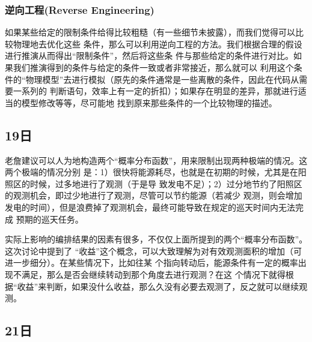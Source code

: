 \begin{itemize}
\subsubsection{\textbf{逆向工程(Reverse Engineering)}}
如果某些给定的限制条件给得比较粗糙（有一些细节未披露），而我们觉得可以比较物理地去优化这些
条件，那么可以利用逆向工程的方法。我们根据合理的假设进行推演从而得出“限制条件”，然后将这些条
件与那些给定的条件进行对比。如果我们推演得到的条件与给定的条件一致或者非常接近，那么就可以
利用这个条件的“物理模型”去进行模拟（原先的条件通常是一些离散的条件，因此在代码从需要一系列的
判断语句，效率上有一定的折扣）；如果存在明显的差异，那就进行适当的模型修改等等，尽可能地
找到原来那些条件的一个比较物理的描述。

\end{itemize}

\subsection{19日}
老詹建议可以人为地构造两个“概率分布函数”，用来限制出现两种极端的情况。这两个极端的情况分别
是：1）很快将能源耗尽，也就是在初期的时候，尤其是在阳照区的时候，过多地进行了观测（于是导
致发电不足）；2）过分地节约了阳照区的观测机会，即过少地进行了观测，尽管可以节约能源（若减少
观测，则会增加发电的时间），但是浪费掉了观测机会，最终可能导致在规定的巡天时间内无法完成
预期的巡天任务。


实际上影响的编排结果的因素有很多，不仅仅上面所提到的两个“概率分布函数”。这次讨论中提到了
“收益”这个概念，可以大致理解为对有效观测面积的增加（可进一步细分）。在某些情况下，比如往某
个指向转动后，能源条件有一定的概率出现不满足，那么是否会继续转动到那个角度去进行观测？在这
个情况下就得根据“收益”来判断，如果没什么收益，那么久没有必要去观测了，反之就可以继续观测。

\subsection{21日}

